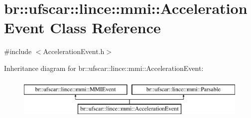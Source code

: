 \hypertarget{classbr_1_1ufscar_1_1lince_1_1mmi_1_1AccelerationEvent}{
\section{br::ufscar::lince::mmi::AccelerationEvent Class Reference}
\label{classbr_1_1ufscar_1_1lince_1_1mmi_1_1AccelerationEvent}
}


{\ttfamily \#include $<$AccelerationEvent.h$>$}

Inheritance diagram for br::ufscar::lince::mmi::AccelerationEvent:\begin{figure}[H]
\begin{center}
\leavevmode
\includegraphics[height=2cm]{classbr_1_1ufscar_1_1lince_1_1mmi_1_1AccelerationEvent}
\end{center}
\end{figure}
